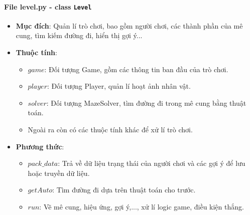 \paragraph{File level.py - class \texttt{Level}}
\begin{itemize}
    \item \textbf{Mục đích}: Quản lí trò chơi, bao gồm người chơi, các thành phần của mê cung, tìm kiếm đường đi, hiển thị gợi ý...
    \item \textbf{Thuộc tính}:
        \begin{itemize}
            \item $game$: Đối tượng Game, gồm các thông tin ban đầu của trò chơi.
            \item $player$: Đối tượng Player, quản lí hoạt ảnh nhân vật.
            \item $solver$: Đối tượng MazeSolver, tìm đường đi trong mê cung bằng thuật toán.
            \item Ngoài ra còn có các thuộc tính khác để xử lí trò chơi.
        \end{itemize}
    \item \textbf{Phương thức}:
        \begin{itemize}
            \item $pack\_data$: Trả về dữ liệu trạng thái của người chơi và các gợi ý để lưu hoặc truyền dữ liệu.
            \item $getAuto$: Tìm đường đi dựa trên thuật toán cho trước.
            \item $run$: Vẽ mê cung, hiệu ứng, gợi ý,..., xử lí logic game, điều kiện thắng.
        \end{itemize}
\end{itemize}

